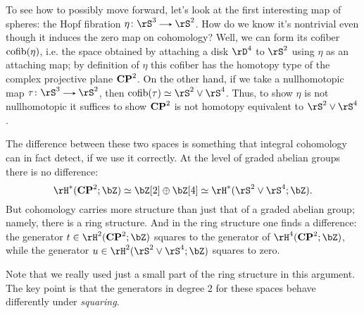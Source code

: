 \begin{nothing}
  \label{hopf-hopf}
  To see how to possibly move forward, let's look at the first interesting map of spheres: the Hopf fibration $\eta \c \rS^3 \to \rS^2$. How do we know it's nontrivial even though it induces the zero map on cohomology? Well, we can form its cofiber $\operatorname*{cofib}(\eta)$, i.e. the space obtained by attaching a disk $\rD^4$ to $\rS^2$ using $\eta$ as an attaching map; by definition of $\eta$ this cofiber has the homotopy type of the complex projective plane $\mathbf{CP}^2$. On the other hand, if we take a nullhomotopic map $\tau \c \rS^3 \to \rS^2$, then $\cofib(\tau) \iso \rS^2 \vee \rS^4$. Thus, to show $\eta$ is not nullhomotopic it suffices to show $\mathbf{CP}^2$ is not homotopy equivalent to $\rS^2 \vee \rS^4$.

  The difference between these two spaces is something that integral cohomology can in fact detect, if we use it correctly. At the level of graded abelian groups there is no difference:
  \[
    \rH^*(\CP^2; \bZ) \iso \bZ[2] \oplus \bZ[4] \iso \rH^*(\rS^2 \vee \rS^4; \bZ).
  \]
  But cohomology carries more structure than just that of a graded abelian group; namely, there is a ring structure. And in the ring structure one finds a difference: the generator $t \in \rH^2(\CP^2;\bZ)$ squares to the generator of $\rH^4(\CP^2;\bZ)$, while the generator $u \in \rH^2(\rS^2 \vee \rS^4; \bZ)$ squares to zero.

  \begin{subremark}
    \label{hopf-hopf-square}
    Note that we really used just a small part of the ring structure in this argument. The key point is that the generators in degree $2$ for these spaces behave differently under \emph{squaring}.
  \end{subremark}
\end{nothing}


